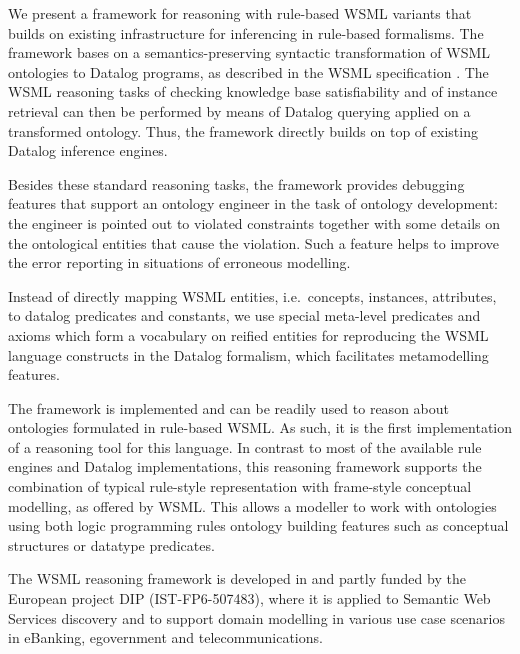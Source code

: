 \smallskip

We present a framework for reasoning with rule-based WSML variants
that builds on existing infrastructure for inferencing in
rule-based formalisms. The framework bases on a
semantics-preserving syntactic transformation of WSML ontologies
to Datalog programs, as described in the WSML specification
\cite{wsml-spec}. The WSML reasoning tasks of checking knowledge
base satisfiability and of instance retrieval can then be
performed by means of Datalog querying applied on a transformed
ontology. Thus, the framework directly builds on top of existing
Datalog inference engines.

Besides these standard reasoning tasks, the framework provides
debugging features that support an ontology engineer in the task
of ontology development: the engineer is pointed out to violated
constraints together with some details on the ontological entities
that cause the violation. Such a feature helps to improve the
error reporting in situations of erroneous modelling.

Instead of directly mapping WSML entities, i.e.\ concepts,
instances, attributes, to datalog predicates and constants, we use
special meta-level predicates and axioms which form a vocabulary
on reified entities for reproducing the WSML language constructs
in the Datalog formalism, which facilitates metamodelling
features.

\smallskip

The framework is implemented and can be readily used to reason
about ontologies formulated in rule-based WSML. As such, it is the
first implementation of a reasoning tool for this language. In
contrast to most of the available rule engines and Datalog
implementations, this reasoning framework supports the combination
of typical rule-style representation with frame-style conceptual
modelling, as offered by WSML. This allows a modeller to work with
ontologies using both logic programming rules ontology building
features such as conceptual structures or datatype predicates.

The WSML reasoning framework is developed in and partly funded by
the European project DIP (IST-FP6-507483), where it is applied to
Semantic Web Services discovery and to support domain modelling in
various use case scenarios in eBanking, egovernment and
telecommunications.
